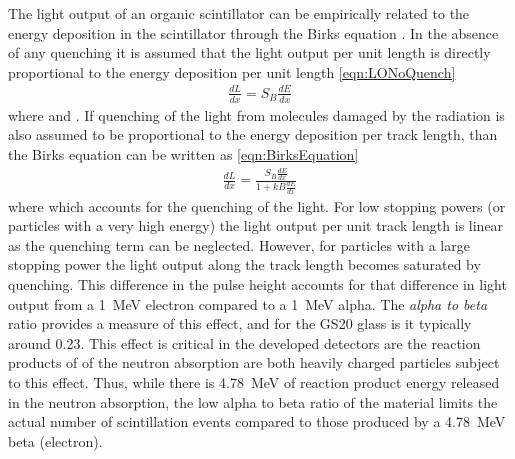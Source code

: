 The light output of an organic scintillator can be empirically related to the energy deposition in the scintillator through the Birks equation \cite{birks_scintillations_1951}.
In the absence of any quenching it is assumed that the light output per unit length is directly proportional to the energy deposition per unit length \eqref{eqn:LONoQuench}
\begin{align}
  \label{eqn:LONoQuench}
    \frac{dL}{dx} = S_B\frac{dE}{dx}
\end{align}
where  and  .
If quenching of the light from molecules damaged by the radiation is also assumed to be proportional to the energy deposition per track length, than the Birks equation can be written as \eqref{eqn:BirksEquation}
\begin{align}
  \label{eqn:BirksEquation}
    \frac{dL}{dx} = \frac{S_B\frac{dE}{dx}}{1+kB\frac{dE}{dx}}
    \end{align}
    where  which accounts for the quenching of the light.
For low stopping powers (or particles with a very high energy) the light output per unit track length is linear as the quenching term can be neglected.
However, for particles with a large stopping power the light output along the track length becomes saturated by quenching.
This difference in the pulse height accounts for that difference in light output from a \SI{1}{\MeV} electron compared to a \SI{1}{\MeV} alpha.
The \textit{alpha to beta} ratio provides a measure of this effect, and for the GS20 glass is it typically around 0.23.
This effect is critical in the developed detectors are the reaction products of of the  neutron absorption are both heavily charged particles subject to this effect.
Thus, while there is \SI{4.78}{\MeV} of reaction product energy released in the neutron absorption, the low alpha to beta ratio of the material limits the actual number of scintillation events compared to those produced by a \SI{4.78}{\MeV} beta (electron).

